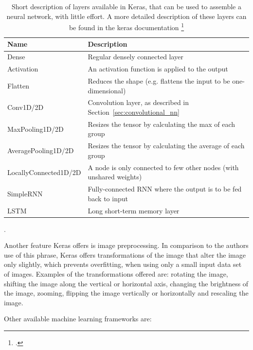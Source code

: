 \begin{center}
	\begin{table}[h!]
		\begin{tabular}{| l | l |}
			\hline
			\bfseries Name & \bfseries Description \\
			\hline
			Dense & Regular densely connected layer \\
			\hline
			Activation & An activation function is applied to the output \\
			\hline
			Flatten & Reduces the shape (e.g. flattens the input to be one-dimensional) \\
			\hline
			Conv1D/2D & Convolution layer, as described in Section~\ref{sec:convolutional_nn} \\
			\hline
			MaxPooling1D/2D & Resizes the tensor by calculating the max of each group \\
			\hline
			AveragePooling1D/2D & Resizes the tensor by calculating the average of each group \\
			\hline
			LocallyConnected1D/2D & A node is only connected to few other nodes (with unshared weights) \\
			SimpleRNN & Fully-connected RNN where the output is to be fed back to input \\
			LSTM & Long short-term memory layer \\
			\hline
		\end{tabular}
		\caption{Short description of layers available in Keras, that can be used to assemble a neural network, with little effort. A more detailed description of these layers can be found in the keras documentation \footcite{kerasDocumentation}}.
		\label{tab:methodology_tensorflow_alternativesToTensorflow_kerasLayers}
	\end{table}
\end{center}

Another feature Keras offers is image preprocessing. In comparison to the authors use of this phrase, Keras offers transformations of the image that alter the image only slightly, which prevents overfitting, when using only a small input data set of images. Examples of the transformations offered are: rotating the image, shifting the image along the vertical or horizontal axis, changing the brightness of the image, zooming, flipping the image vertically or horizontally and rescaling the image.

\vspace{0.5cm}

Other available machine learning frameworks are:

